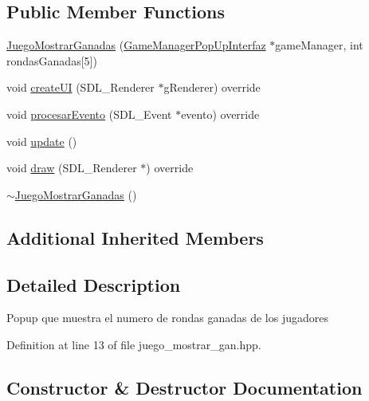 \subsection*{Public Member Functions}
\begin{DoxyCompactItemize}
\item 
\hyperlink{class_juego_mostrar_ganadas_a10c73cf6722bac7bcfe1377230d7de8c}{Juego\+Mostrar\+Ganadas} (\hyperlink{class_game_manager_pop_up_interfaz}{Game\+Manager\+Pop\+Up\+Interfaz} $\ast$game\+Manager, int rondas\+Ganadas\mbox{[}5\mbox{]})
\item 
void \hyperlink{class_juego_mostrar_ganadas_a8952d565827d92657069f51a4c5abb6b}{create\+UI} (S\+D\+L\+\_\+\+Renderer $\ast$g\+Renderer) override
\item 
void \hyperlink{class_juego_mostrar_ganadas_a4341d078a4b11450df46b7e2ace3fd86}{procesar\+Evento} (S\+D\+L\+\_\+\+Event $\ast$evento) override
\item 
void \hyperlink{class_juego_mostrar_ganadas_a049acb4e679c3c4357729badda704fab}{update} ()
\item 
void \hyperlink{class_juego_mostrar_ganadas_a78f2844459e28a19e7451fc583dc4701}{draw} (S\+D\+L\+\_\+\+Renderer $\ast$) override
\item 
\hyperlink{class_juego_mostrar_ganadas_ac602830245ca9f03f82083db93c67538}{$\sim$\+Juego\+Mostrar\+Ganadas} ()
\end{DoxyCompactItemize}
\subsection*{Additional Inherited Members}


\subsection{Detailed Description}
Popup que muestra el numero de rondas ganadas de los jugadores 

Definition at line 13 of file juego\+\_\+mostrar\+\_\+gan.\+hpp.



\subsection{Constructor \& Destructor Documentation}
